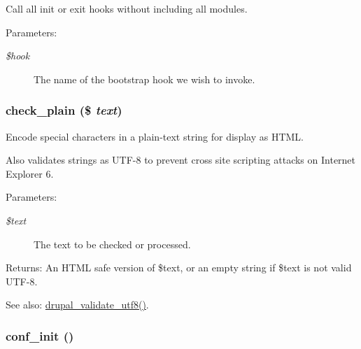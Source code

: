 Call all init or exit hooks without including all modules.

\begin{Desc}
\item[Parameters:]
\begin{description}
\item[{\em \$hook}]The name of the bootstrap hook we wish to invoke. \end{description}
\end{Desc}
\hypertarget{bootstrap_8inc_76fc67a30fd8d75ddd80565e6e65a13d}{
\subsubsection[{check\_\-plain}]{\setlength{\rightskip}{0pt plus 5cm}check\_\-plain (\$ {\em text})}}
\label{bootstrap_8inc_76fc67a30fd8d75ddd80565e6e65a13d}


Encode special characters in a plain-text string for display as HTML.

Also validates strings as UTF-8 to prevent cross site scripting attacks on Internet Explorer 6.

\begin{Desc}
\item[Parameters:]
\begin{description}
\item[{\em \$text}]The text to be checked or processed. \end{description}
\end{Desc}
\begin{Desc}
\item[Returns:]An HTML safe version of \$text, or an empty string if \$text is not valid UTF-8.\end{Desc}
\begin{Desc}
\item[See also:]\hyperlink{bootstrap_8inc_bf62947a33393477301b0070b1ff0c7a}{drupal\_\-validate\_\-utf8()}. \end{Desc}
\hypertarget{bootstrap_8inc_fedab27d166f281dfc2b4068866ab896}{
\subsubsection[{conf\_\-init}]{\setlength{\rightskip}{0pt plus 5cm}conf\_\-init ()}}
\label{bootstrap_8inc_fedab27d166f281dfc2b4068866ab896}


